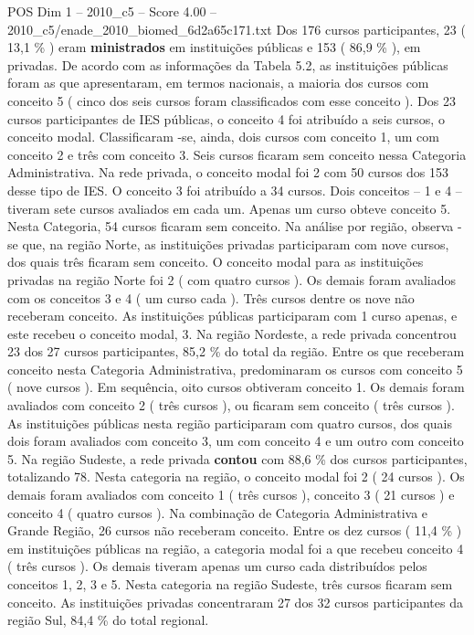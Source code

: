 \begin{textsample}{POS Dim 1 – 2010\_c5 – Score 4.00 – 2010\_c5/enade\_2010\_biomed\_6d2a65c171.txt}
Dos 176 cursos participantes, 23 ( 13,1 \% ) eram \textbf{ministrados} em instituições públicas e 153 ( 86,9 \% ), em privadas.
De acordo com as informações da Tabela 5.2, as instituições públicas foram as que apresentaram, em termos nacionais, a maioria dos cursos com conceito 5 ( cinco dos seis cursos foram classificados com esse conceito ).
Dos 23 cursos participantes de IES públicas, o conceito 4 foi atribuído a seis cursos, o conceito modal.
Classificaram -se, ainda, dois cursos com conceito 1, um com conceito 2 e três com conceito 3.
Seis cursos ficaram sem conceito nessa Categoria Administrativa.
Na rede privada, o conceito modal foi 2 com 50 cursos dos 153 desse tipo de IES.
O conceito 3 foi atribuído a 34 cursos.
Dois conceitos – 1 e 4 – tiveram sete cursos avaliados em cada um.
Apenas um curso obteve conceito 5.
Nesta Categoria, 54 cursos ficaram sem conceito.
Na análise por região, observa -se que, na região Norte, as instituições privadas participaram com nove cursos, dos quais três ficaram sem conceito.
O conceito modal para as instituições privadas na região Norte foi 2 ( com quatro cursos ).
Os demais foram avaliados com os conceitos 3 e 4 ( um curso cada ).
Três cursos dentre os nove não receberam conceito.
As instituições públicas participaram com 1 curso apenas, e este recebeu o conceito modal, 3.
Na região Nordeste, a rede privada concentrou 23 dos 27 cursos participantes, 85,2 \% do total da região.
Entre os que receberam conceito nesta Categoria Administrativa, predominaram os cursos com conceito 5 ( nove cursos ).
Em sequência, oito cursos obtiveram conceito 1.
Os demais foram avaliados com conceito 2 ( três cursos ), ou ficaram sem conceito ( três cursos ).
As instituições públicas nesta região participaram com quatro cursos, dos quais dois foram avaliados com conceito 3, um com conceito 4 e um outro com conceito 5.
Na região Sudeste, a rede privada \textbf{contou} com 88,6 \% dos cursos participantes, totalizando 78.
Nesta categoria na região, o conceito modal foi 2 ( 24 cursos ).
Os demais foram avaliados com conceito 1 ( três cursos ), conceito 3 ( 21 cursos ) e conceito 4 ( quatro cursos ).
Na combinação de Categoria Administrativa e Grande Região, 26 cursos não receberam conceito.
Entre os dez cursos ( 11,4 \% ) em instituições públicas na região, a categoria modal foi a que recebeu conceito 4 ( três cursos ).
Os demais tiveram apenas um curso cada distribuídos pelos conceitos 1, 2, 3 e 5.
Nesta categoria na região Sudeste, três cursos ficaram sem conceito.
As instituições privadas concentraram 27 dos 32 cursos participantes da região Sul, 84,4 \% do total regional.

\end{textsample}
